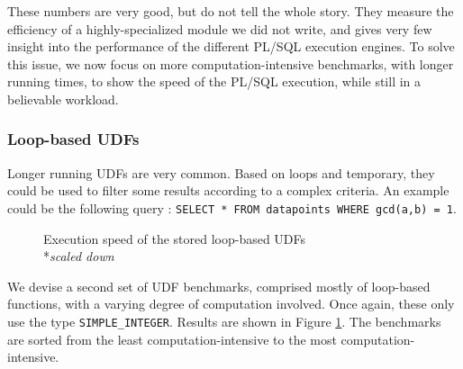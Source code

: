 \documentclass[twoside,11pt,a4paper]{article}
\newcommand{\sql}[1]{\texttt{#1}}
\newcommand{\pls}[1]{\small\texttt{#1}\normalsize}
\newcommand{\plstype}[1]{\pls{#1}}
\newcommand{\simpleint}{\plstype{SIMPLE\_INTEGER}}
\begin{document}
These numbers are very good, but do not tell the whole story. They measure the efficiency of a highly-specialized module we did not write, and gives very few insight into the performance of the different PL/SQL execution engines. To solve this issue, we now focus on more computation-intensive benchmarks, with longer running times, to show the speed of the PL/SQL execution, while still in a believable workload.

\subsubsection{Loop-based UDFs}

Longer running UDFs are very common. Based on loops and temporary, they could be used to filter some results according to a complex criteria. An example could be the following query : \sql{SELECT * FROM datapoints WHERE gcd(a,b) = 1}.

\begin{figure}[tp]
	\centering
	\caption[Execution speed of the loop-based UDFs]{Execution speed of the stored loop-based UDFs\\
			\hspace*{-5cm}*\textit{scaled down}}
	\label{fig:exp1b}
\end{figure}

We devise a second set of UDF benchmarks, comprised mostly of loop-based functions, with a varying degree of computation involved. Once again, these only use the type \simpleint{}. Results are shown in Figure \ref{fig:exp1b}. The benchmarks are sorted from the least computation-intensive to the most computation-intensive.
\end{document}
